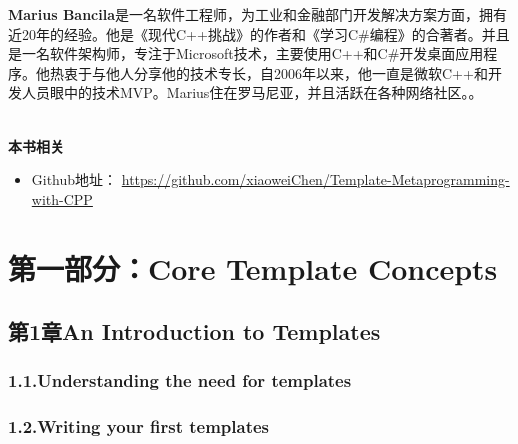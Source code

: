 \documentclass[11pt,a4paper,UTF8]{book}
\begin{document}
\begin{sloppypar}
		\textbf{Marius Bancila}是一名软件工程师，为工业和金融部门开发解决方案方面，拥有近20年的经验。他是《现代C++挑战》的作者和《学习C\#编程》的合著者。并且是一名软件架构师，专注于Microsoft技术，主要使用C++和C\#开发桌面应用程序。他热衷于与他人分享他的技术专长，自2006年以来，他一直是微软C++和开发人员眼中的技术MVP。Marius住在罗马尼亚，并且活跃在各种网络社区。。
	
		
		\hspace*{\fill} \\ %
		\noindent\textbf{本书相关}
		\begin{itemize}
			\item Github地址：
			\url{https://github.com/xiaoweiChen/Template-Metaprogramming-with-CPP}
		\end{itemize}
		\newpage
		
		\pagestyle{empty}
		
		\newpage
		
		\tableofcontents
		\newpage
		
		
		\color{white}
		\section*{第一部分：Core Template Concepts}
		\pagecolor{mygray}
		\textbf{}
		\newpage
		\color{black}
		\pagecolor{white}
		
		\subsection*{ 第1章\hspace{0.5cm}An Introduction to Templates}
		
		
		\subsubsection*{ 1.1.\hspace{0.2cm}Understanding the need for templates}
		
		
		\subsubsection*{ 1.2.\hspace{0.2cm}Writing your first templates}
		
		

\end{sloppypar}
\end{document}
